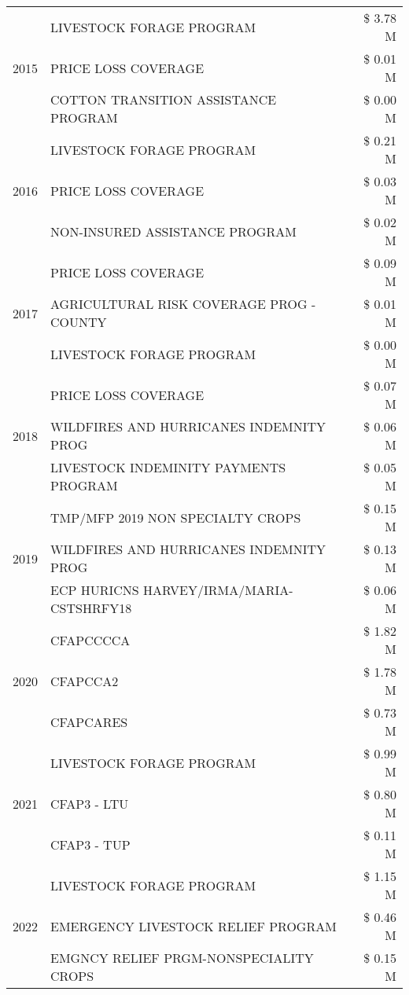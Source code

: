 \begin{tabular}{llr}
\cline{1-3}
\multirow[t]{3}{*}{2015} & LIVESTOCK FORAGE PROGRAM & \$ 3.78 M \\
 & PRICE LOSS COVERAGE & \$ 0.01 M \\
 & COTTON TRANSITION ASSISTANCE PROGRAM & \$ 0.00 M \\
\cline{1-3}
\multirow[t]{3}{*}{2016} & LIVESTOCK FORAGE PROGRAM & \$ 0.21 M \\
 & PRICE LOSS COVERAGE & \$ 0.03 M \\
 & NON-INSURED ASSISTANCE PROGRAM & \$ 0.02 M \\
\cline{1-3}
\multirow[t]{3}{*}{2017} & PRICE LOSS COVERAGE & \$ 0.09 M \\
 & AGRICULTURAL RISK COVERAGE PROG - COUNTY & \$ 0.01 M \\
 & LIVESTOCK FORAGE PROGRAM & \$ 0.00 M \\
\cline{1-3}
\multirow[t]{3}{*}{2018} & PRICE LOSS COVERAGE & \$ 0.07 M \\
 & WILDFIRES AND HURRICANES INDEMNITY PROG & \$ 0.06 M \\
 & LIVESTOCK INDEMINITY PAYMENTS PROGRAM & \$ 0.05 M \\
\cline{1-3}
\multirow[t]{3}{*}{2019} & TMP/MFP 2019 NON SPECIALTY CROPS & \$ 0.15 M \\
 & WILDFIRES AND HURRICANES INDEMNITY PROG & \$ 0.13 M \\
 & ECP HURICNS HARVEY/IRMA/MARIA-CSTSHRFY18 & \$ 0.06 M \\
\cline{1-3}
\multirow[t]{3}{*}{2020} & CFAPCCCCA & \$ 1.82 M \\
 & CFAPCCA2 & \$ 1.78 M \\
 & CFAPCARES & \$ 0.73 M \\
\cline{1-3}
\multirow[t]{3}{*}{2021} & LIVESTOCK FORAGE PROGRAM & \$ 0.99 M \\
 & CFAP3 - LTU & \$ 0.80 M \\
 & CFAP3 - TUP & \$ 0.11 M \\
\cline{1-3}
\multirow[t]{3}{*}{2022} & LIVESTOCK FORAGE PROGRAM & \$ 1.15 M \\
 & EMERGENCY LIVESTOCK RELIEF PROGRAM & \$ 0.46 M \\
 & EMGNCY RELIEF PRGM-NONSPECIALITY CROPS & \$ 0.15 M \\
\cline{1-3}
\bottomrule
\end{tabular}
